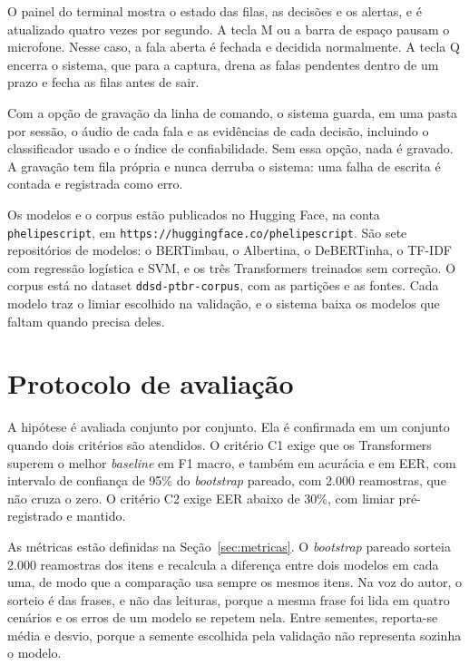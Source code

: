 \documentclass[
    12pt,                %
    openright,           %
    oneside,             %
    a4paper,             %
    english,             %
    brazil               %
]{abntex2}
\begin{document}
O painel do terminal mostra o estado das filas, as decisões e os alertas, e é atualizado quatro vezes por segundo. A tecla M ou a barra de espaço pausam o microfone. Nesse caso, a fala aberta é fechada e decidida normalmente. A tecla Q encerra o sistema, que para a captura, drena as falas pendentes dentro de um prazo e fecha as filas antes de sair.

Com a opção de gravação da linha de comando, o sistema guarda, em uma pasta por sessão, o áudio de cada fala e as evidências de cada decisão, incluindo o classificador usado e o índice de confiabilidade. Sem essa opção, nada é gravado. A gravação tem fila própria e nunca derruba o sistema: uma falha de escrita é contada e registrada como erro.

Os modelos e o corpus estão publicados no Hugging Face, na conta \texttt{phelipescript}, em \texttt{https://huggingface.co/phelipescript}. São sete repositórios de modelos: o BERTimbau, o Albertina, o DeBERTinha, o TF-IDF com regressão logística e SVM, e os três Transformers treinados sem correção. O corpus está no dataset \texttt{ddsd-ptbr-corpus}, com as partições e as fontes. Cada modelo traz o limiar escolhido na validação, e o sistema baixa os modelos que faltam quando precisa deles.


\section{Protocolo de avaliação}
\label{sec:avaliacao}

A hipótese é avaliada conjunto por conjunto. Ela é confirmada em um conjunto quando dois critérios são atendidos. O critério C1 exige que os Transformers superem o melhor \textit{baseline} em F1 macro, e também em acurácia e em EER, com intervalo de confiança de 95\% do \textit{bootstrap} pareado, com 2.000 reamostras, que não cruza o zero. O critério C2 exige EER abaixo de 30\%, com limiar pré-registrado e mantido.

As métricas estão definidas na Seção~\ref{sec:metricas}. O \textit{bootstrap} pareado \cite{Efron1979} sorteia 2.000 reamostras dos itens e recalcula a diferença entre dois modelos em cada uma, de modo que a comparação usa sempre os mesmos itens. Na voz do autor, o sorteio é das frases, e não das leituras, porque a mesma frase foi lida em quatro cenários e os erros de um modelo se repetem nela. Entre sementes, reporta-se média e desvio, porque a semente escolhida pela validação não representa sozinha o modelo.
\end{document}
